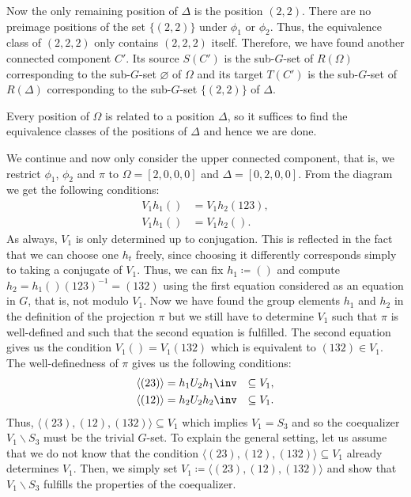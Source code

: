 \begin{exmp}
Now the only remaining position of $\Delta$ is the position $(2,2)$. There are no preimage positions of the set $\{(2,2)\}$ under $\phi_1$ or $\phi_2$. Thus, the equivalence class of $(2,2,2)$ only contains $(2,2,2)$ itself. Therefore, we have found another connected component $C'$. Its source $S(C')$ is the sub-$G$-set of $R(\Omega)$ corresponding to the sub-$G$-set $\varnothing$ of $\Omega$ and its target $T(C')$ is the sub-$G$-set of $R(\Delta)$ corresponding to the sub-$G$-set $\{(2,2)\}$ of $\Delta$.

Every position of $\Omega$ is related to a position $\Delta$, so it suffices to find the equivalence classes of the positions of $\Delta$ and hence we are done.
\end{exmp}

\begin{exmp}
We continue  and now only consider the upper connected component, that is, we restrict $\phi_1$, $\phi_2$ and $\pi$ to $\Omega = [2,0,0,0]$ and $\Delta = [0,2,0,0]$. From the diagram we get the following conditions:
\begin{equation}
\begin{aligned}
V_1h_1() &= V_1h_2(123),\\ \label{coequalizers_in_skeletal_G_sets_1_is_coeq}
V_1h_1() &= V_1h_2().
\end{aligned}
\end{equation}
As always, $V_1$ is only determined up to conjugation. This is reflected in the fact that we can choose one $h_t$ freely, since choosing it differently corresponds simply to taking a conjugate of $V_1$. Thus, we can fix $h_1 \coloneqq ()$ and compute $h_2 = h_1()(123)^{-1} = (132)$ using the first equation considered as an equation in $G$, that is, not modulo $V_1$. Now we have found the group elements $h_1$ and $h_2$ in the definition of the projection $\pi$ but we still have to determine $V_1$ such that $\pi$ is well-defined and such that the second equation is fulfilled. The second equation gives us the condition $V_1() = V_1(132)$ which is equivalent to $(132) \in V_1$. The well-definedness of $\pi$ gives us the following conditions:
\begin{equation}
\begin{aligned}
\langle (23) \rangle &= h_1 U_2 h_1\inv &\subseteq V_1,\\ \label{coequalizers_in_skeletal_G_sets_1_well_defined}
\langle (12) \rangle &= h_2 U_2 h_2\inv &\subseteq V_1.
\end{aligned}
\end{equation}
Thus, $\langle (23),(12),(132) \rangle \subseteq V_1$ which implies $V_1 = S_3$ and so the coequalizer $V_1 \backslash S_3$ must be the trivial $G$-set. To explain the general setting, let us assume that we do not know that the condition $\langle (23),(12),(132) \rangle \subseteq V_1$ already determines $V_1$. Then, we simply set $V_1 \coloneqq \langle (23),(12),(132) \rangle$ and show that $V_1 \backslash S_3$ fulfills the properties of the coequalizer.


\end{exmp}
